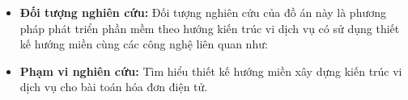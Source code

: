 \begin{itemize}

\item \textbf{Đối tượng nghiên cứu:} Đối tượng nghiên cứu của đồ án này là phương pháp phát triển phần mềm theo hướng kiến trúc vi dịch vụ có sử dụng thiết kế hướng miền cùng các công nghệ liên quan như:








\item \textbf{Phạm vi nghiên cứu:} Tìm hiểu thiết kế hướng miền xây dựng kiến trúc vi dịch vụ cho bài toán hóa đơn điện tử.

\end{itemize}